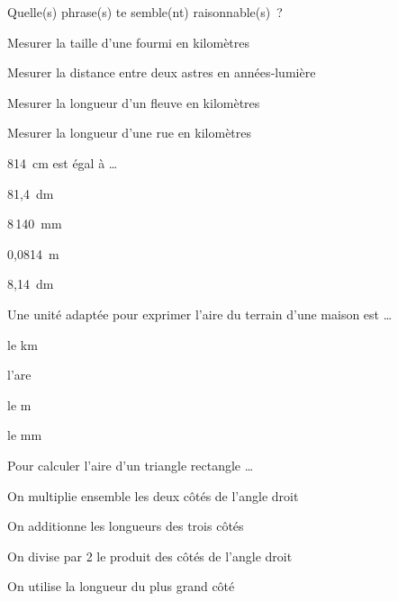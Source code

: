 \begin{QCM}
\begin{GroupeQCM}
    
    \begin{exercice}
      Quelle(s) phrase(s) te semble(nt) raisonnable(s) ?
      \begin{ChoixQCM}{4}
      \item Mesurer la taille d'une fourmi en kilomètres
      \item Mesurer la distance entre deux astres en années‑lumière
      \item Mesurer la longueur d'un fleuve en kilomètres
      \item Mesurer la longueur d'une rue en kilomètres
      \end{ChoixQCM}
\begin{corrige}
   \end{corrige}
    \end{exercice}


    \begin{exercice}
      814 cm est égal à \ldots
      \begin{ChoixQCM}{4}
      \item 81,4 dm
      \item 8\,140 mm
      \item 0,0814 m
      \item 8,14 dm
      \end{ChoixQCM}
\begin{corrige}
   \end{corrige}
    \end{exercice}
    
 
    \begin{exercice}
      Une unité adaptée pour exprimer l'aire du terrain d'une maison est \ldots
      \begin{ChoixQCM}{4}
      \item le km
      \item l'are
      \item le m
      \item le mm
      \end{ChoixQCM}
\begin{corrige}
   \end{corrige}
    \end{exercice}
    
    
    \begin{exercice}
      Pour calculer l'aire d'un triangle rectangle \ldots
      \begin{ChoixQCM}{4}
      \item On multiplie ensemble les deux côtés de l'angle droit
      \item On additionne les longueurs des trois côtés
      \item On divise par 2 le produit des côtés de l'angle droit
      \item On utilise la longueur du plus grand côté
      \end{ChoixQCM}
\begin{corrige}
   \end{corrige}
    \end{exercice}
    

\end{GroupeQCM}
\end{QCM}
